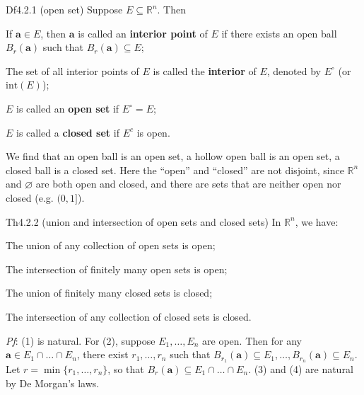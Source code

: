 \documentclass{article}
\begin{document}
\begin{Df}{Df4.2.1 (open set)}
    Suppose $E\subseteq\mathbb{R}^n$. Then 
    \begin{compactenum}
        \item If $\pmb{a}\in E$, then $\pmb{a}$ is called an \textbf{interior point} of $E$ if there exists an open ball $B_r(\pmb{a})$ such that $B_r(\pmb{a})\subseteq E$;
        \item The set of all interior points of $E$ is called the \textbf{interior} of $E$, denoted by $E^\circ$ (or $\text{int}(E)$);
        \item $E$ is called an \textbf{open set} if $E^\circ = E$;
        \item $E$ is called a \textbf{closed set} if $E^c$ is open.
    \end{compactenum}
\end{Df}

\begin{Rmk}{}
    We find that \textcolor{Th}{an open ball is an open set, a hollow open ball is an open set, a closed ball is a closed set}. Here the ``open'' and ``closed'' are not disjoint, since \textcolor{Th}{$\mathbb{R}^n$ and $\varnothing$ are both open and closed}, and \textcolor{Th}{there are sets that are neither open nor closed (e.g. $(0,1]$).}
\end{Rmk}

\begin{Th}{Th4.2.2 (union and intersection of open sets and closed sets)}
    In $\mathbb{R}^n$, we have:
    \begin{compactenum}
        \item The union of any collection of open sets is open;
        \item The intersection of finitely many open sets is open;
        \item The union of finitely many closed sets is closed;
        \item The intersection of any collection of closed sets is closed.
    \end{compactenum}
    \tcblower
    \textit{Pf}: (1) is natural. For (2), suppose $E_1, \dots, E_n$ are open. Then for any $\pmb{a}\in E_1\cap\dots\cap E_n$, there exist $r_1, \dots, r_n$ such that $B_{r_1}(\pmb{a})\subseteq E_1, \dots, B_{r_n}(\pmb{a})\subseteq E_n$. Let $r = \min\{r_1, \dots, r_n\}$, so that $B_r(\pmb{a})\subseteq E_1\cap\dots\cap E_n$. (3) and (4) are natural by De Morgan's laws. 
\end{Th}
\end{document}
